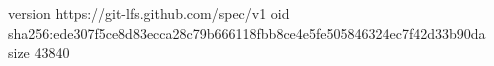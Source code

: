version https://git-lfs.github.com/spec/v1
oid sha256:ede307f5ce8d83ecca28c79b666118fbb8ce4e5fe505846324ec7f42d33b90da
size 43840
